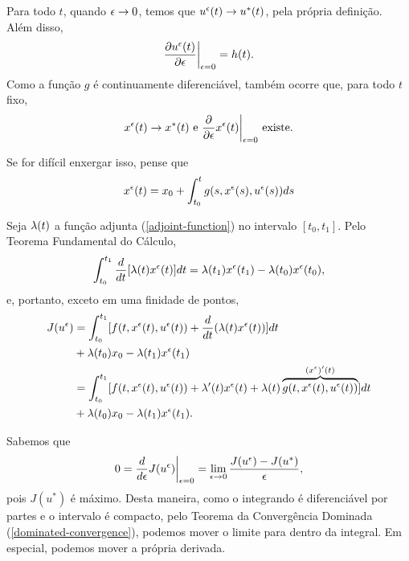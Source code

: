 Para todo $t$, quando $\epsilon \to 0$, temos que $u^{\epsilon}(t) \to u^*(t)$, pela
própria definição. Além disso, 
\begin{equation*}
    \frac{\partial u^{\epsilon}(t)}{\partial \epsilon}\bigg\rvert_{\epsilon = 0} = h(t).
\end{equation*}
Como a função $g$ é continuamente diferenciável, também ocorre que, para todo
$t$ fixo, 
\begin{equation*}
        x^{\epsilon}(t) \to x^*(t) \text{ e }
        \frac{\partial}{\partial \epsilon}x^{\epsilon}(t)\bigg\rvert_{\epsilon = 0} \text{ existe.}
\end{equation*}
\begin{remark}
    Se for difícil enxergar isso, pense que 
    $$x^{\epsilon}(t) = x_0 + \int_{t_0}^t
    g(s, x^{\epsilon}(s), u^{\epsilon}(s))ds$$
\end{remark}
Seja $\lambda(t)$ a função adjunta (\ref{adjoint-function}) no intervalo $[t_0, t_1]$. Pelo Teorema Fundamental do Cálculo, 
\begin{equation*}
    \int_{t_0}^{t_1} \frac{d}{dt}[\lambda(t)x^{\epsilon}(t)]dt = \lambda(t_1)x^{\epsilon}(t_1) - \lambda(t_0)x^{\epsilon}(t_0),
\end{equation*}
e, portanto, exceto em uma finidade de pontos,
\begin{equation*}
    \begin{split}
        J(u^{\epsilon}) &= \int_{t_0}^{t_1} [f(t,x^{\epsilon}(t), u^{\epsilon}(t)) + \frac{d}{dt}(\lambda(t)x^{\epsilon}(t))]dt \\
        &+ \lambda(t_0)x_0 - \lambda(t_1)x^{\epsilon}(t_1) \\
        &= \int_{t_0}^{t_1} [f(t, x^{\epsilon}(t), u^{\epsilon}(t)) + \lambda '(t)x^{\epsilon}(t) + \lambda(t)\overbrace{g(t,x^{\epsilon}(t), u^{\epsilon}(t))}^{(x^{\epsilon})'(t)}] dt \\
        &+ \lambda(t_0)x_0 - \lambda(t_1)x^{\epsilon}(t_1).
    \end{split}
\end{equation*}

Sabemos que 
\begin{equation*}
    0 = \frac{d}{d\epsilon} J(u^{\epsilon})\bigg\rvert_{\epsilon = 0} = \lim_{\epsilon \to 0} \frac{J(u^{\epsilon}) - J(u^{*})}{\epsilon}, 
\end{equation*}
pois $J(u^*)$ é máximo. Desta maneira, como o integrando é diferenciável por
partes e o intervalo é compacto, pelo Teorema da Convergência Dominada
(\ref{dominated-convergence}), podemos mover o limite para dentro da integral.
Em especial, podemos mover a própria derivada. 

